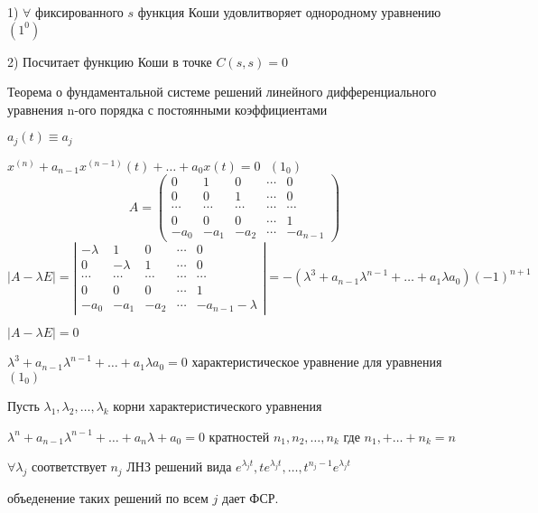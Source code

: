 \begin{block}
  1) $\forall$ фиксированного $s$ функция Коши удовлитворяет однородному
  уравнению $(1^0)$

  2) Посчитает функцию Коши в точке $C(s,s) = 0$
\end{block}

\begin{title}[\Large]
  Теорема о фундаментальной системе решений линейного дифференциального
  уравнения n-ого порядка с постоянными коэффициентами
\end{title}

\begin{define}
  $a_j(t) \equiv a_j$

  $x^{(n)} + a_{n-1} x^{(n-1)}(t) + \ldots + a_0x(t) = 0 ~~~ (1_0)$
  $$
  A =
  \left(
  \begin{array}{ccccc}
    0 & 1 & 0 & \cdots & 0 \\
    0 & 0 & 1 & \cdots & 0 \\
    \cdots & \cdots & \cdots & \cdots & \cdots \\
    0 & 0 & 0 & \cdots & 1 \\
    -a_0 & -a_1 & -a_2 & \cdots & -a_{n-1}
  \end{array}
  \right)
  $$
  $$
  |A - \lambda E| =
  \left|
  \begin{array}{ccccc}
    -\lambda & 1 & 0 & \cdots & 0 \\
    0 & -\lambda & 1 & \cdots & 0 \\
    \cdots & \cdots & \cdots & \cdots & \cdots \\
    0 & 0 & 0 & \cdots  &  1\\
    -a_0 & -a_1 & -a_2 & \cdots & -a_{n-1} - \lambda
  \end{array}
  \right|
  = -(\lambda^3 + a_{n-1}\lambda^{n-1} + \ldots + a_1\lambda a_0)(-1)^{n+1}
  $$

  $|A - \lambda E| = 0$

  $\lambda^3 + a_{n-1}\lambda^{n-1} + \ldots + a_1\lambda a_0 = 0$
  характеристическое уравнение для уравнения $(1_0)$
\end{define}

\begin{theorem}
  Пусть $\lambda_1, \lambda_2, \ldots, \lambda_k$ корни характеристического
  уравнения

  $\lambda^n + a_{n-1} \lambda^{n-1} + \ldots + a_n\lambda + a_0 = 0$ кратностей
  $n_1, n_2, \ldots, n_k$ где $n_1, + \ldots + n_k = n$

  $\forall \lambda_j$ соответствует $n_j$ ЛНЗ решений вида $e^{\lambda_j t},
  te^{\lambda_j t}, \ldots, t^{n_j - 1} e^{\lambda_j t}$

  объеденение таких решений по всем $j$ дает ФСР.
\end{theorem}

